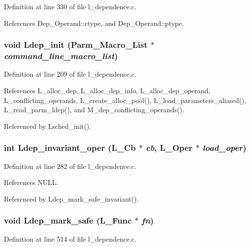 Definition at line 330 of file l\_\-dependence.c.

References Dep\_\-Operand::ctype, and Dep\_\-Operand::ptype.
\subsubsection{\setlength{\rightskip}{0pt plus 5cm}void Ldep\_\-init (\bf{Parm\_\-Macro\_\-List} $\ast$ {\em command\_\-line\_\-macro\_\-list})}\label{l__dependence_8c_f86ee8daba5e7fa68b9b230cfee0ebe0}




Definition at line 209 of file l\_\-dependence.c.

References L\_\-alloc\_\-dep, L\_\-alloc\_\-dep\_\-info, L\_\-alloc\_\-dep\_\-operand, L\_\-conflicting\_\-operands, L\_\-create\_\-alloc\_\-pool(), L\_\-load\_\-parameters\_\-aliased(), L\_\-read\_\-parm\_\-ldep(), and M\_\-dep\_\-conflicting\_\-operands().

Referenced by Lsched\_\-init().
\subsubsection{\setlength{\rightskip}{0pt plus 5cm}int Ldep\_\-invariant\_\-oper (L\_\-Cb $\ast$ {\em cb}, L\_\-Oper $\ast$ {\em load\_\-oper})}\label{l__dependence_8c_948fc124a08d861c6a4e501a82ee58c4}




Definition at line 282 of file l\_\-dependence.c.

References NULL.

Referenced by Ldep\_\-mark\_\-safe\_\-invariant().
\subsubsection{\setlength{\rightskip}{0pt plus 5cm}void Ldep\_\-mark\_\-safe (L\_\-Func $\ast$ {\em fn})}\label{l__dependence_8c_eb5239833bb75d328e2e84dd49f420f0}




Definition at line 514 of file l\_\-dependence.c.

